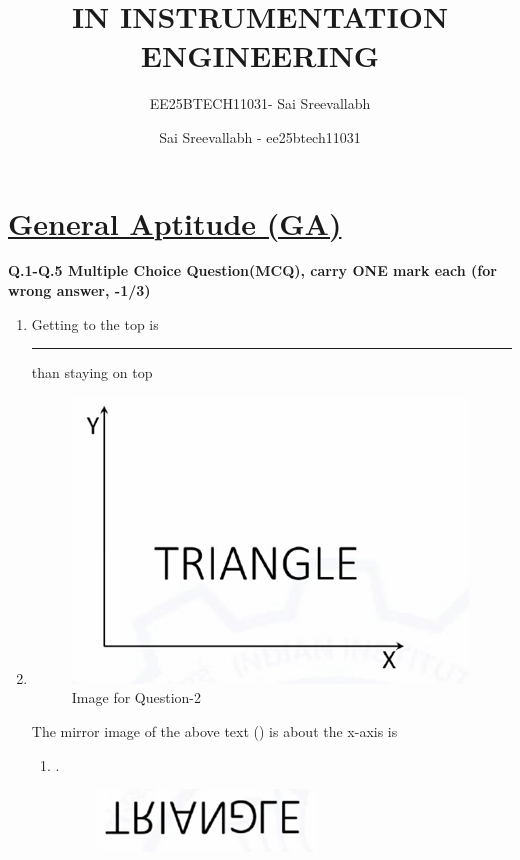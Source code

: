 \documentclass[journal,12pt,onecolumn]{IEEEtran}
\title{IN  INSTRUMENTATION ENGINEERING}
\author{EE25BTECH11031- Sai Sreevallabh}
\author{Sai Sreevallabh - ee25btech11031}
\theoremstyle{remark}
\begin{document}
\maketitle

\section*{\underline{General Aptitude (GA)}}

\textbf{Q.1-Q.5 Multiple Choice Question(MCQ), carry ONE mark each (for wrong answer, -1/3)}

\begin{enumerate}
\item Getting to the top is \rule{1.5cm}{0.4pt} than staying on top
\par \hfill{}
\begin{enumerate}
\end{enumerate}

\item \begin{figure}[H]
    \centering
    \includegraphics[width=0.5\linewidth]{Figs/Q-2(GA).png}
    \caption{Image for Question-2}
    \label{2}
\end{figure} 
The mirror image of the above text () is about the x-axis is \par \hfill{}
\begin{enumerate}
    \item . \begin{figure}[H]
    \centering
    \includegraphics[width=0.15\linewidth]{Figs/Q-2(option1)(GA).png}
    \end{figure}
        

\end{enumerate}
\end{enumerate}
\end{document}
